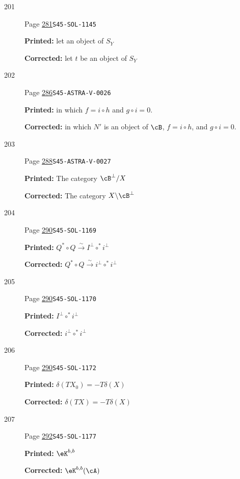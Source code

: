 \documentclass[oneside]{book}
\newcommand{\iso}{\xrightarrow\sim}
\theoremstyle{sga-source}
\theoremstyle{sga-source-dash}
\theoremstyle{sga-source-dotdash}
\theoremstyle{sga-source-number-note-dash}
\theoremstyle{sga-source-note-number-dotdash}
\theoremstyle{sga-source-example-dotdash}
\theoremstyle{sga-source-inline-number}
\theoremstyle{sga-source-bare-number}
\theoremstyle{sga-source}
\begin{document}
\begin{description}
\item[\hypertarget{apparatus:EN-0201}{201}] Page \hyperlink{printpage:en:281}{281}\quad\texttt{S45-SOL-1145}
\par\noindent\textbf{Printed:} let an object
    of $S_Y$
\par\noindent\textbf{Corrected:} let $t$ be an object
    of $S_Y$
\smallskip
\item[\hypertarget{apparatus:EN-0202}{202}] Page \hyperlink{printpage:en:286}{286}\quad\texttt{S45-ASTRA-V-0026}
\par\noindent\textbf{Printed:} in which $f=i\circ h$ and $g\circ i=0$.
\par\noindent\textbf{Corrected:} in which $N'$ is an object of $\cB$, $f=i\circ h$, and $g\circ i=0$.
\smallskip
\item[\hypertarget{apparatus:EN-0203}{203}] Page \hyperlink{printpage:en:288}{288}\quad\texttt{S45-ASTRA-V-0027}
\par\noindent\textbf{Printed:} The category $\cB^\bot/X$
\par\noindent\textbf{Corrected:} The category $X\backslash\cB^\bot$
\smallskip
\item[\hypertarget{apparatus:EN-0204}{204}] Page \hyperlink{printpage:en:290}{290}\quad\texttt{S45-SOL-1169}
\par\noindent\textbf{Printed:} \(Q^\ast\circ Q\iso I^\bot\circ ^\ast i^\bot\)
\par\noindent\textbf{Corrected:} \(Q^\ast\circ Q\iso i^\bot\circ ^\ast i^\bot\)
\smallskip
\item[\hypertarget{apparatus:EN-0205}{205}] Page \hyperlink{printpage:en:290}{290}\quad\texttt{S45-SOL-1170}
\par\noindent\textbf{Printed:} \(I^\bot\circ ^\ast i^\bot\)
\par\noindent\textbf{Corrected:} \(i^\bot\circ ^\ast i^\bot\)
\smallskip
\item[\hypertarget{apparatus:EN-0206}{206}] Page \hyperlink{printpage:en:290}{290}\quad\texttt{S45-SOL-1172}
\par\noindent\textbf{Printed:} \(\delta(TX_0)=-T\delta(X)\)
\par\noindent\textbf{Corrected:} \(\delta(TX)=-T\delta(X)\)
\smallskip
\item[\hypertarget{apparatus:EN-0207}{207}] Page \hyperlink{printpage:en:292}{292}\quad\texttt{S45-SOL-1177}
\par\noindent\textbf{Printed:} \(\eK^{b,b}\)
\par\noindent\textbf{Corrected:} \(\eK^{b,b}(\cA)\)
\smallskip

\end{description}
\end{document}
